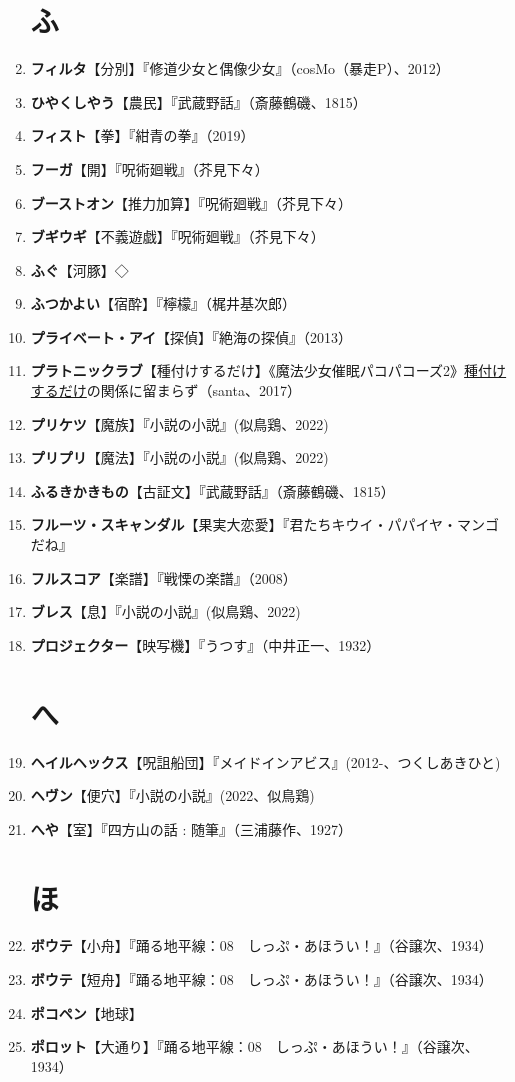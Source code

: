 \documentclass[twocolumn]{jsbook}
\newcommand{\ccite}[1]{《#1》}
\begin{document}
\begin{enumerate}
\section*{ふ}
    \item \textbf{フィルタ}【分別】『修道少女と偶像少女』（cosMo（暴走P）、2012）
    \item \textbf{ひやくしやう}【農民】『武蔵野話』（斎藤鶴磯、1815）
    \item \textbf{フィスト}【拳】『紺青の拳』（2019）
    \item \textbf{フーガ}【開】『呪術廻戦』（芥見下々）
    \item \textbf{ブーストオン}【推力加算】『呪術廻戦』（芥見下々）
    \item \textbf{ブギウギ}【不義遊戯】『呪術廻戦』（芥見下々）
    \item \textbf{ふぐ}【河豚】◇
    \item \textbf{ふつかよい}【宿酔】『檸檬』（梶井基次郎）
    \item \textbf{プライベート・アイ}【探偵】『絶海の探偵』（2013）
    \item \textbf{プラトニックラブ}【種付けするだけ】\ccite{魔法少女催眠パコパコーズ2}{\uline{種付けするだけ}の関係に留まらず}（santa、2017）
    \item \textbf{プリケツ}【魔族】『小説の小説』(似鳥鶏、2022)
    \item \textbf{プリプリ}【魔法】『小説の小説』(似鳥鶏、2022)
    \item \textbf{ふるきかきもの}【古証文】『武蔵野話』（斎藤鶴磯、1815）
    \item \textbf{フルーツ・スキャンダル}【果実大恋愛】『君たちキウイ・パパイヤ・マンゴだね』
    \item \textbf{フルスコア}【楽譜】『戦慄の楽譜』（2008）
    \item \textbf{ブレス}【息】『小説の小説』(似鳥鶏、2022)
    \item \textbf{プロジェクター}【映写機】『うつす』（中井正一、1932）
\section*{へ}
    \item \textbf{ヘイルヘックス}【呪詛船団】『メイドインアビス』(2012-、つくしあきひと)
    \item \textbf{ヘヴン}【便穴】『小説の小説』(2022、似鳥鶏)
    \item \textbf{へや}【室】『四方山の話 : 随筆』（三浦藤作、1927）
\section*{ほ}
    \item \textbf{ボウテ}【小舟】『踊る地平線：08　しっぷ・あほうい！』（谷譲次、1934）
    \item \textbf{ボウテ}【短舟】『踊る地平線：08　しっぷ・あほうい！』（谷譲次、1934）
    \item \textbf{ポコペン}【地球】
    \item \textbf{ポロット}【大通り】『踊る地平線：08　しっぷ・あほうい！』（谷譲次、1934）

\end{enumerate}
\end{document}
